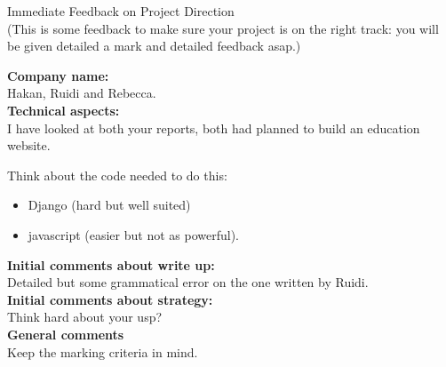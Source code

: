 \documentclass{article}
\begin{document}
\begin{center}
\Huge{Immediate Feedback on Project Direction}\\
\tiny{(This is some feedback to make sure your project is on the right track: you will be given detailed a mark and detailed feedback asap.)}
\end{center}


\normalsize
\textbf{Company name:}\\

Hakan, Ruidi and Rebecca. \\

\textbf{Technical aspects:}\\

I have looked at both your reports, both had planned to build an education website.

Think about the code needed to do this:

\begin{itemize}
    \item Django (hard but well suited)
    \item javascript (easier but not as powerful).
\end{itemize}

\textbf{Initial comments about write up:}\\

Detailed but some grammatical error on the one written by Ruidi.\\

\textbf{Initial comments about strategy:}\\

Think hard about your usp?\\

\textbf{General comments}\\

Keep the marking criteria in mind.
\end{document}
